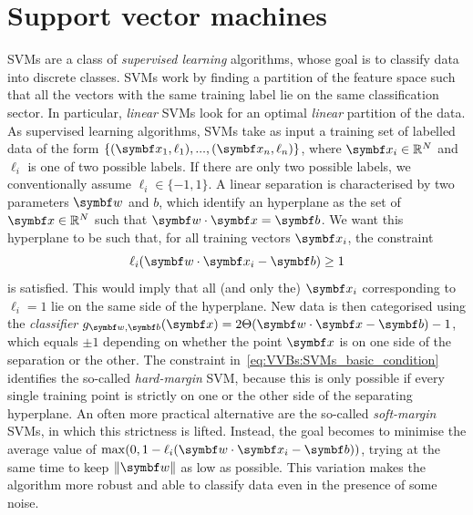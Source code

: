 \section{Support vector machines}
\label{sec:VVBs:SVMs}


\acfp{SVM} are a class of \emph{supervised learning} algorithms, whose goal is to classify data into discrete classes. \acp{SVM} work by finding a partition of the feature space such that all the vectors with the same training label lie on the same classification sector.
In particular, \emph{linear} \acp{SVM} look for an optimal \emph{linear} partition of the data.
As supervised learning algorithms, SVMs take as input a training set of labelled data of the form $\{(\bs x_1,\ell_1),...,(\bs x_n,\ell_n)\}$, where $\bs x_i\in\RR^N$ and $\ell_i$ is one of two possible labels. If there are only two possible labels, we conventionally assume $\ell_i\in\{-1,1\}$.
A linear separation is characterised by two parameters $\bs w$ and $b$, which identify an hyperplane as the set of $\bs x\in\RR^N$ such that $\bs w\cdot\bs x=\bs b$. We want this hyperplane to be such that, for all training vectors $\bs x_i$, the constraint
\begin{equation}
	\ell_i(\bs w\cdot\bs x_i-\bs b)\ge1
	\label{eq:VVBs:SVMs_basic_condition}
\end{equation}
is satisfied. This would imply that all (and only the) $\bs x_i$ corresponding to $\ell_i=1$ lie on the same side of the hyperplane.
New data is then categorised using the \emph{classifier} $g_{\bs w,\bs b}(\bs x)=2\Theta(\bs w\cdot\bs x-\bs b)-1$, which equals $\pm1$ depending on whether the point $\bs x$ is on one side of the separation or the other.
The constraint in~\cref{eq:VVBs:SVMs_basic_condition} identifies the so-called \emph{hard-margin} SVM, because this is only possible if every single training point is strictly on one or the other side of the separating hyperplane.
An often more practical alternative are the so-called \emph{soft-margin} SVMs, in which this strictness is lifted. Instead, the goal becomes to minimise the average value of
$\max(0, 1- \ell_i (\bs w\cdot\bs x_i-\bs b))$, trying at the same time to keep $\|\bs w\|$ as low as possible. This variation makes the algorithm more robust and able to classify data even in the presence of some noise.

